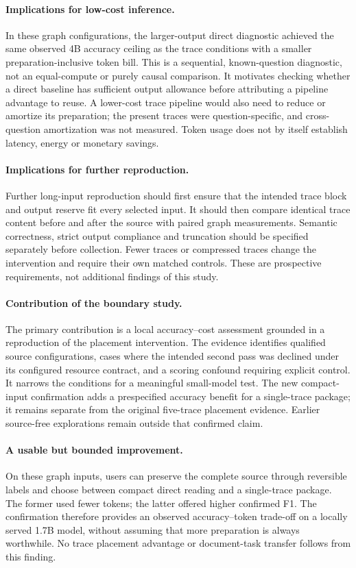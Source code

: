 \paragraph{Implications for low-cost inference.} In these graph configurations, the larger-output direct diagnostic achieved the same observed 4B accuracy ceiling as the trace conditions with a smaller preparation-inclusive token bill. This is a sequential, known-question diagnostic, not an equal-compute or purely causal comparison. It motivates checking whether a direct baseline has sufficient output allowance before attributing a pipeline advantage to reuse. A lower-cost trace pipeline would also need to reduce or amortize its preparation; the present traces were question-specific, and cross-question amortization was not measured. Token usage does not by itself establish latency, energy or monetary savings.

\paragraph{Implications for further reproduction.} Further long-input reproduction should first ensure that the intended trace block and output reserve fit every selected input. It should then compare identical trace content before and after the source with paired graph measurements. Semantic correctness, strict output compliance and truncation should be specified separately before collection. Fewer traces or compressed traces change the intervention and require their own matched controls. These are prospective requirements, not additional findings of this study.

\paragraph{Contribution of the boundary study.} The primary contribution is a local accuracy--cost assessment grounded in a reproduction of the placement intervention. The evidence identifies qualified source configurations, cases where the intended second pass was declined under its configured resource contract, and a scoring confound requiring explicit control. It narrows the conditions for a meaningful small-model test. The new compact-input confirmation adds a prespecified accuracy benefit for a single-trace package; it remains separate from the original five-trace placement evidence. Earlier source-free explorations remain outside that confirmed claim.

\paragraph{A usable but bounded improvement.} On these graph inputs, users can preserve the complete source through reversible labels and choose between compact direct reading and a single-trace package. The former used fewer tokens; the latter offered higher confirmed F1. The confirmation therefore provides an observed accuracy--token trade-off on a locally served 1.7B model, without assuming that more preparation is always worthwhile. No trace placement advantage or document-task transfer follows from this finding.

